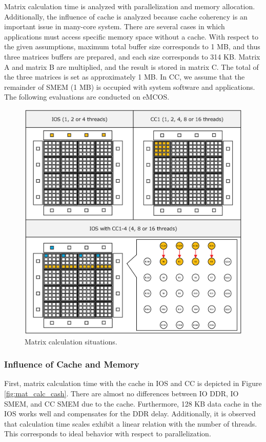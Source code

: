 \documentclass{sig-alternate-05-2015}
\begin{document}
Matrix calculation time is analyzed with parallelization and memory allocation.
Additionally, the influence of cache is analyzed because cache coherency is an important issue in many-core system.
There are several cases in which applications must access specific memory space without a cache.
With respect to the given assumptions, maximum total buffer size corresponds to 1 MB, and thus three matrices buffers are prepared, and each size corresponds to 314 KB.
Matrix A and matrix B are multiplied, and the result is stored in matrix C.
The total of the three matrices is set as approximately 1 MB.
In CC, we assume that the remainder of SMEM (1 MB) is occupied with system software and applications.
The following evaluations are conducted on eMCOS.

\begin{figure}[t]
  \centering
  \includegraphics[width=1.0\linewidth]{../figure/matrix_calculation.eps}
  \caption{\label{fig:mat_calc}
    Matrix calculation situations.}
\end{figure}

\subsubsection{Influence of Cache and Memory}
\label{sec:cache_and_memory}
First, matrix calculation time with the cache in IOS and CC is depicted in Figure \ref{fig:mat_calc_cash}.
There are almost no differences between IO DDR, IO SMEM, and CC SMEM due to the cache.
Furthermore, 128 KB data cache in the IOS works well and compensates for the DDR delay.
Additionally, it is observed that calculation time scales exhibit a linear relation with the number of threads.
This corresponds to ideal behavior with respect to parallelization.
\end{document}
